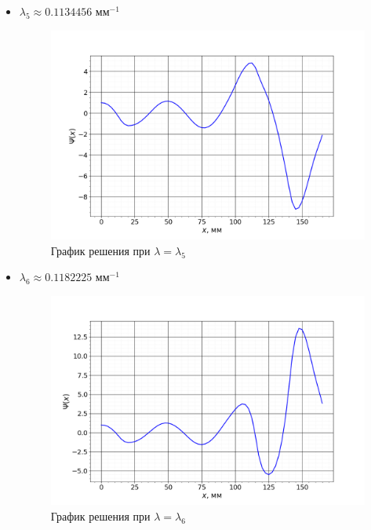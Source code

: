 \begin{itemize}
		
			\item $\lambda_5 \approx 0.1134456$ мм$^{-1}$
			\begin{figure}[h!]
				\centering
				\includegraphics[width=0.92\linewidth]{Pictures/Normal/5.png}
				\caption{График решения при $\lambda = \lambda_5$}
			\end{figure}
		
		
			\newpage
			\item $\lambda_6 \approx 0.1182225$ мм$^{-1}$
			\begin{figure}[h!]
				\centering
				\includegraphics[width=0.92\linewidth]{Pictures/Normal/6.png}
				\caption{График решения при $\lambda = \lambda_6$}
			\end{figure}
		

\end{itemize}
